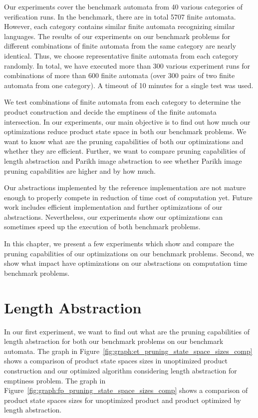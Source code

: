 Our experiments cover the benchmark automata from 40 various categories of verification runs. In the benchmark, there are in total 5707 finite automata. However, each category contains similar finite automata recognizing similar languages. The results of our experiments on our benchmark problems for different combinations of finite automata from the same category are nearly identical. Thus, we choose representative finite automata from each category randomly. In total, we have executed more than 300 various experiment runs for combinations of more than 600 finite automata (over 300 pairs of two finite automata from one category). A timeout of 10 minutes for a single test was used.

We test combinations of finite automata from each category to determine the product construction and decide the emptiness of the finite automata intersection. In our experiments, our main objective is to find out how much our optimizations reduce product state space in both our benchmark problems. We want to know what are the pruning capabilities of both our optimizations and whether they are efficient. Further, we want to compare pruning capabilities of length abstraction and Parikh image abstraction to see whether Parikh image pruning capabilities are higher and by how much.

Our abstractions implemented by the reference implementation are not mature enough to properly compete in reduction of time cost of computation yet. Future work includes efficient implementation and further optimizations of our abstractions. Nevertheless, our experiments show our optimizations can sometimes speed up the execution of both benchmark problems.

In this chapter, we present a few experiments which show and compare the pruning capabilities of our optimizations on our benchmark problems. Second, we show what impact have optimizations on our abstractions on computation time benchmark problems.

\section{Length Abstraction}

In our first experiment, we want to find out what are the pruning capabilities of length abstraction for both our benchmark problems on our benchmark automata. The graph in Figure~\ref{fig:graph:et_pruning_state_space_sizes_comp} shows a comparison of product state spaces sizes in unoptimized product construction and our optimized algorithm considering length abstraction for emptiness problem. The graph in Figure~\ref{fig:graph:fp_pruning_state_space_sizes_comp} shows a comparison of product state spaces sizes for unoptimized product and product optimized by length abstraction.

